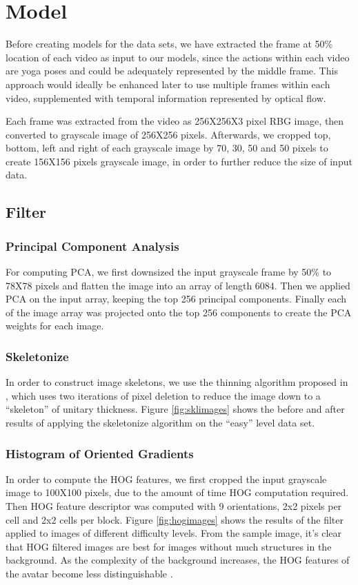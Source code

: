 \documentclass[
	a4paper, %
	10pt, %
	unnumberedsections, %
	twoside, %
]{t0004}
\begin{document}
\section{Model}

Before creating models for the data sets, we have extracted the frame at 50\% location of each video as input to our models, since the actions within each video are yoga poses and could be adequately represented by the middle frame. This approach would ideally be enhanced later to use multiple frames within each video, supplemented with temporal information represented by optical flow.

Each frame was extracted from the video as 256X256X3 pixel RBG image, then converted to grayscale image of 256X256 pixels. Afterwards, we cropped top, bottom, left and right of each grayscale image by 70, 30, 50 and 50 pixels to create 156X156 pixels grayscale image, in order to further reduce the size of input data.

\subsection{Filter}

\subsubsection{Principal Component Analysis} For computing PCA, we first downsized the input grayscale frame by 50\% to 78X78 pixels and flatten the image into an array of length 6084. Then we applied PCA on the input array, keeping the top 256 principal components. Finally each of the image array was projected onto the top 256 components to create the PCA weights for each image.


\subsubsection{Skeletonize} In order to construct image skeletons, we use the thinning algorithm proposed in \cite{TYZhang:1984qr}, which uses two iterations of pixel deletion to reduce the image down to a ``skeleton'' of unitary thickness. Figure \ref{fig:sklimages} shows the before and after results of applying the skeletonize algorithm on the ``easy'' level data set.

\subsubsection{Histogram of Oriented Gradients} In order to compute the HOG features, we first cropped the input grayscale image to 100X100 pixels, due to the amount of time HOG computation required. Then HOG feature descriptor was computed with 9 orientations, 2x2 pixels per cell and 2x2 cells per block. Figure \ref{fig:hogimages} shows the results of the filter applied to images of different difficulty levels. From the sample image, it's clear that HOG filtered images are best for images without much structures in the background. As the complexity of the background increases, the HOG features of the avatar become less distinguishable .
\end{document}
